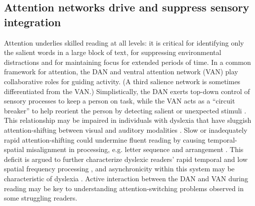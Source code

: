 \subsection{Attention networks drive and suppress sensory integration} 
Attention underlies skilled reading at all levels: it is critical for identifying only the salient words in a large block of text, for suppressing environmental distractions and for maintaining focus for extended periods of time. In a common framework for attention, the DAN and ventral attention network (VAN) play collaborative roles for guiding activity. (A third salience network is sometimes differentiated from the VAN.) Simplistically, the DAN exerts top-down control of sensory processes to keep a person on task, while the VAN acts as a ``circuit breaker'' to help reorient the person by detecting salient or unexpected stimuli \citep{Corbetta2002, Vossel2014}. This relationship may be impaired in individuals with dyslexia that have sluggish attention-shifting between visual and auditory modalities \citep{Harrar2014}. Slow or inadequately rapid attention-shifting could undermine fluent reading by causing temporal-spatial misalignment in processing, e.g. letter sequence and arrangement \citep{Lallier2009}. This deficit is argued to further characterize dyslexic readers' rapid temporal and low spatial frequency processing \citep{Witton1998}, and asynchronicity within this system may be characteristic of dyslexia \citep{Lallier2009}. Active interaction between the DAN and VAN during reading may be key to understanding attention-switching problems observed in some struggling readers. 

